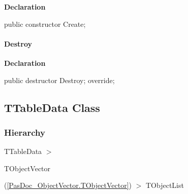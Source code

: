 \documentclass{report}
\newif\ifpdf
\begin{document}
\label{PasDoc_Gen.TRowData-Create}
\begin{list}{}{
\setlength{\itemindent}{0cm}
\setlength{\listparindent}{0cm}
\setlength{\leftmargin}{\evensidemargin}
\addtolength{\leftmargin}{\tmplength}
\settowidth{\labelsep}{X}
\addtolength{\leftmargin}{\labelsep}
\setlength{\labelwidth}{\tmplength}
}
\item[\textbf{Declaration}\hfill]
\ifpdf
\begin{flushleft}
\fi
\begin{ttfamily}
public constructor Create;\end{ttfamily}

\ifpdf
\end{flushleft}
\fi

\end{list}
\paragraph*{Destroy}\hspace*{\fill}

\label{PasDoc_Gen.TRowData-Destroy}
\begin{list}{}{
\setlength{\itemindent}{0cm}
\setlength{\listparindent}{0cm}
\setlength{\leftmargin}{\evensidemargin}
\addtolength{\leftmargin}{\tmplength}
\settowidth{\labelsep}{X}
\addtolength{\leftmargin}{\labelsep}
\setlength{\labelwidth}{\tmplength}
}
\item[\textbf{Declaration}\hfill]
\ifpdf
\begin{flushleft}
\fi
\begin{ttfamily}
public destructor Destroy; override;\end{ttfamily}

\ifpdf
\end{flushleft}
\fi

\end{list}
\ifpdf
\subsection*{\large{\textbf{TTableData Class}}\normalsize\hspace{1ex}\hrulefill}
\else
\subsection*{TTableData Class}
\fi
\label{PasDoc_Gen.TTableData}
\subsubsection*{\large{\textbf{Hierarchy}}\normalsize\hspace{1ex}\hfill}
TTableData {$>$} \begin{ttfamily}TObjectVector\end{ttfamily}(\ref{PasDoc_ObjectVector.TObjectVector}) {$>$} 
TObjectList
\end{document}
